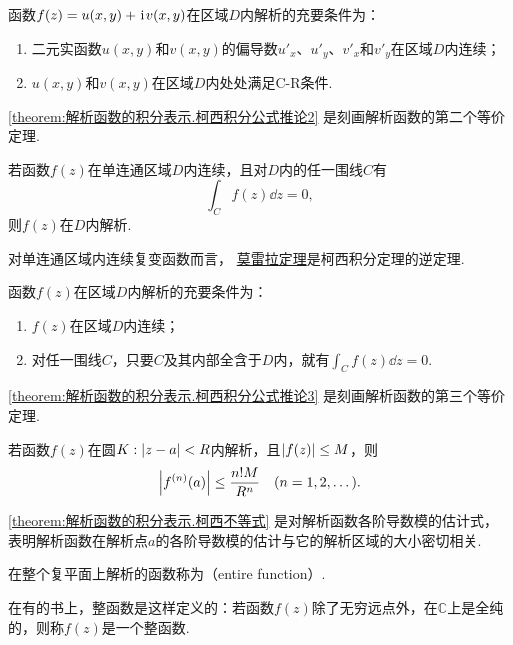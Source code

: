 \begin{corollary}\label{theorem:解析函数的积分表示.柯西积分公式推论2}
函数\(f(z)=u(x,y)+\kern1pt\mathrm{i}\kern1pt v(x,y)\)在区域\(D\)内解析的充要条件为：
\begin{enumerate}
\item 二元实函数\(u(x,y)\)和\(v(x,y)\)的偏导数\(u'_x\)、\(u'_y\)、\(v'_x\)和\(v'_y\)在区域\(D\)内连续；
\item \(u(x,y)\)和\(v(x,y)\)在区域\(D\)内处处满足C-R条件.
\end{enumerate}
\end{corollary}
\cref{theorem:解析函数的积分表示.柯西积分公式推论2} 是刻画解析函数的第二个等价定理.

\begin{theorem}[莫雷拉定理]\label{theorem:解析函数的积分表示.莫雷拉定理}
若函数\(f(z)\)在单连通区域\(D\)内连续，且对\(D\)内的任一围线\(C\)有\[
\int_C f(z) \dd{z} = 0,
\]则\(f(z)\)在\(D\)内解析.
\end{theorem}
对单连通区域内连续复变函数而言，
\hyperref[theorem:解析函数的积分表示.莫雷拉定理]{莫雷拉定理}是柯西积分定理的逆定理.

\begin{theorem}\label{theorem:解析函数的积分表示.柯西积分公式推论3}
函数\(f(z)\)在区域\(D\)内解析的充要条件为：
\begin{enumerate}
\item \(f(z)\)在区域\(D\)内连续；
\item 对任一围线\(C\)，只要\(C\)及其内部全含于\(D\)内，就有\(\int_C f(z) \dd{z} = 0\).
\end{enumerate}
\end{theorem}
\cref{theorem:解析函数的积分表示.柯西积分公式推论3} 是刻画解析函数的第三个等价定理.

\begin{theorem}[柯西不等式]
若函数\(f(z)\)在圆\(K: \abs{z-a}<R\)内解析，且\(\abs{f(z)} \leq M\)，则\begin{equation}\label{theorem:解析函数的积分表示.柯西不等式}
\abs{f^{(n)}(a)} \leq \frac{n! M}{R^n}
\quad(n=1,2,\dots).
\end{equation}
\end{theorem}
\cref{theorem:解析函数的积分表示.柯西不等式} 是对解析函数各阶导数模的估计式，表明解析函数在解析点\(a\)的各阶导数模的估计与它的解析区域的大小密切相关.

\begin{definition}
在整个复平面上解析的函数称为（entire function）.
\end{definition}
在有的书上，整函数是这样定义的：若函数\(f(z)\)除了无穷远点外，在\(\mathbb{C}\)上是全纯的，则称\(f(z)\)是一个整函数.

